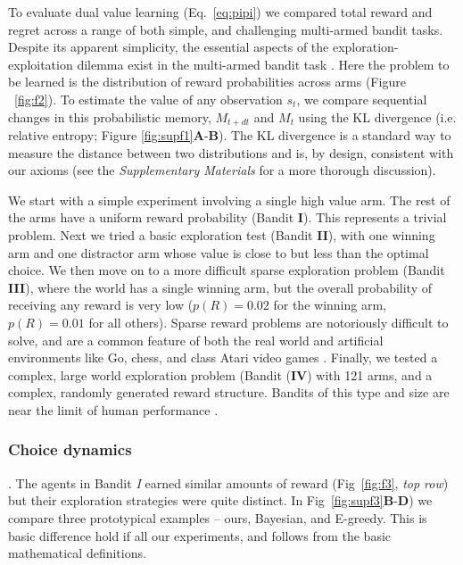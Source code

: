 \documentclass[9pt,lineno]{elife}
\begin{document}
To evaluate dual value learning (Eq.~\ref{eq:pipi}) we compared total reward and regret across a range of both simple, and challenging multi-armed bandit tasks. Despite its apparent simplicity, the essential aspects of the exploration-exploitation dilemma exist in the multi-armed bandit task \cite{Sutton2018}. Here the problem to be learned is the distribution of reward probabilities across arms (Figure ~\ref{fig:f2}).  To estimate the value of any observation $s_t$, we compare sequential changes in this probabilistic memory, $M_{t+dt}$ and $M_t$ using the KL divergence (i.e. relative entropy; Figure \ref{fig:supf1}\textbf{A}-\textbf{B}). The KL divergence is a standard way to measure the distance between two distributions \cite{MacKay2003} and is, by design, consistent with our axioms (see the \textit{Supplementary Materials} for a more thorough discussion). 

We start with a simple experiment involving a single high value arm. The rest of the arms have a uniform reward probability (Bandit \textbf{I}). This represents a trivial problem. Next we tried a basic exploration test (Bandit \textbf{II}), with one winning arm and one distractor arm whose value is close to but less than the optimal choice. We then move on to a more difficult sparse exploration problem (Bandit \textbf{III}), where the world has a single winning arm, but the overall probability of receiving any reward is very low ($p(R) = 0.02$ for the winning arm, $p(R) = 0.01$ for all others). Sparse reward problems are notoriously difficult to solve, and are a common feature of both the real world and artificial environments like Go, chess, and class Atari video games \cite{Mniha,Silver2016b,Silver2018}. Finally, we tested a complex, large world exploration problem (Bandit (\textbf{IV}) with 121 arms, and a complex, randomly generated reward structure. Bandits of this type and size are near the limit of human performance \cite{Wu2018}. 

\subsubsection*{Choice dynamics}. 
The agents in Bandit \textit{I} earned similar amounts of reward (Fig~\ref{fig:f3}, \textit{top row}) but their exploration strategies were quite distinct. In Fig~\ref{fig:supf3}\textbf{B}-\textbf{D}) we compare three prototypical examples -- ours, Bayesian, and E-greedy. This is basic difference hold if all our experiments, and follows from the basic mathematical definitions.
\end{document}
